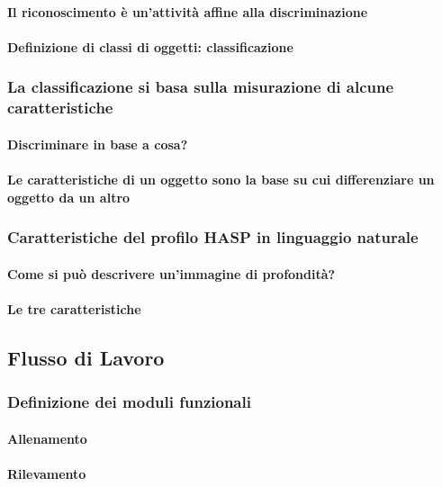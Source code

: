                 \paragraph{Il riconoscimento è un'attività affine alla discriminazione}
                \paragraph{Definizione di classi di oggetti: classificazione}
            \subsubsection{La classificazione si basa sulla misurazione di alcune caratteristiche}
                \paragraph{Discriminare in base a cosa?}
                \paragraph{Le caratteristiche di un oggetto sono la base su cui differenziare un oggetto da un altro}
            \subsubsection{Caratteristiche del profilo HASP in linguaggio naturale}
                \paragraph{Come si può descrivere un'immagine di profondità?}
                \paragraph{Le tre caratteristiche}
        \subsection{Flusso di Lavoro}
        \label{sub:overall_workflow}
            \subsubsection{Definizione dei moduli funzionali}
                \paragraph{Allenamento}
                \paragraph{Rilevamento}
